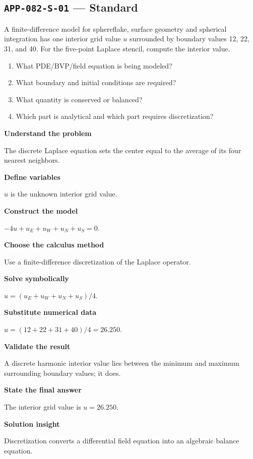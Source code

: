 \documentclass[11pt]{book}
\newcommand{\pid}[1]{\texttt{#1}}
\begin{document}
\subsection*{\pid{APP-082-S-01} — Standard}
\begin{problembox}
A finite-difference model for sphereflake, surface geometry and spherical integration has one interior grid value $u$ surrounded by boundary values 12, 22, 31, and 40. For the five-point Laplace stencil, compute the interior value.
\end{problembox}
\begin{promptbox}\begin{enumerate}
\item What PDE/BVP/field equation is being modeled?
\item What boundary and initial conditions are required?
\item What quantity is conserved or balanced?
\item Which part is analytical and which part requires discretization?
\end{enumerate}\end{promptbox}
\begin{solutionbox}
\textbf{Understand the problem}\par The discrete Laplace equation sets the center equal to the average of its four nearest neighbors.\par\medskip
\textbf{Define variables}\par $u$ is the unknown interior grid value.\par\medskip
\textbf{Construct the model}\par $-4u+u_E+u_W+u_N+u_S=0$.\par\medskip
\textbf{Choose the calculus method}\par Use a finite-difference discretization of the Laplace operator.\par\medskip
\textbf{Solve symbolically}\par $u=(u_E+u_W+u_N+u_S)/4$.\par\medskip
\textbf{Substitute numerical data}\par $u=(12+22+31+40)/4=26.250$.\par\medskip
\textbf{Validate the result}\par A discrete harmonic interior value lies between the minimum and maximum surrounding boundary values; it does.\par\medskip
\textbf{State the final answer}\par The interior grid value is $u=26.250$.\par\medskip
\textbf{Solution insight}\par Discretization converts a differential field equation into an algebraic balance equation.\par\medskip
\end{solutionbox}
\end{document}
